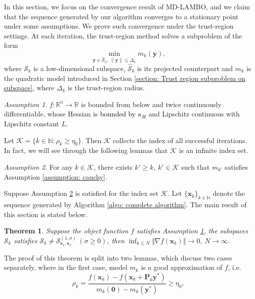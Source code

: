 \documentclass[colorlinks=true, linkcolor=blue, citecolor=blue, urlcolor=blue]{article}
\theoremstyle{plain}
\newtheorem{theorem}{Theorem}[section]
\theoremstyle{definition}
\theoremstyle{remark}
\newtheorem{assumption}{Assumption}
\begin{document}
In this section, we focus on the convergence result of MD-LAMBO, and we claim that the sequence generated by our algorithm converges to a stationary point under some assumptions. We prove such convergence under the trust-region settings. 
At each iteration, the trust-region method solves a subproblem of the form 
\[
\min_{\bm{y} \in \hat{\mathcal{S}}_k, \ \|\bm{y}\| \leq \Delta_k} m_k(\bm{y}),
\]
where $\mathcal{S}_k$ is a low-dimensional subspace, $\hat{\mathcal{S}}_k$ is its projected counterpart and $m_k$ is the quadratic model introduced in Section \ref{section: Trust region subproblem on subspace}, where $\Delta_k$ is the trust-region radius.
    \begin{assumption}\label{assumption: about f}
        $f:\mathbb{R}^n\to\mathbb{R}$ is bounded from below and twice continuously differentiable, whose Hessian is \textcolor{black}{bounded by $\kappa_H$} and Lipschitz continuous with Lipschitz constant $L$. 
    \end{assumption} 
    Let $\mathcal{K}=\{k\in\mathbb{N}:\rho_k\geq\eta_0\}$. Then $\mathcal{K}$ collects the index of all successful iterations. In fact, we will see through the following lemmas that $\mathcal{K}$ is an infinite index set.  \begin{assumption}\label{assumption: many m_k satisfies cauchy assump}
        For any $k\in\mathcal{K}$, there exists $k'\geq k,\ k'\in\mathcal{K}$ such that $m_{k'}$ satisfies Assumption \ref{assumption: cauchy}.
    \end{assumption}
    Suppose Assumption \ref{assumption: many m_k satisfies cauchy assump} is satisfied for the index set $\mathcal{K}$. Let $\{\bm x_k\}_{k\in\mathbb{N}}$ denote the sequence generated by Algorithm \ref{algo: complete algorithm}. The main result of this section is stated below. \begin{theorem}
     Suppose the object function $f$ satisfies Assumption \ref{assumption: about f}, the subspaces $\mathcal{S}_k$ satisfies $\mathcal{S}_k\neq\mathcal{S}_{\bm s_1,\bm s_2}^{(1,\sigma)}\ (\sigma\geq 0)$, then
       $\inf_{k\leq N}\Vert \nabla f(\bm x_k)\Vert \to 0,\ N\to\infty.$
    \end{theorem}
    The proof of this theorem is split into two lemmas, which discuss two cases separately, where in the first case, model $m_k$ is a good approximation of $f$, i.e. \begin{equation}\label{ineq:convergence_rho_eta}
        \rho_k=\frac{f(\bm{x}_k)-f(\bm{x}_k+\bm{P}_k \bm y^{*})}{m_k(\bm 0)-m_k(\bm y^*)}\geq \eta_0,
    \end{equation}
\end{document}
